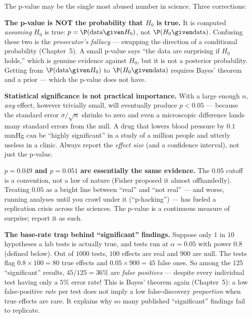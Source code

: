 The p-value may be the single most abused number in science. Three corrections:

\begin{trapbox}
\textbf{The p-value is NOT the probability that $H_0$ is true.} It is computed
\emph{assuming} $H_0$ is true: $p = \P(\text{data}\given H_0)$, not $\P(H_0\given
\text{data})$. Confusing these two is the \emph{prosecutor's fallacy} --- swapping the
direction of a conditional probability (Chapter~5). A small p-value says ``the data are
surprising if $H_0$ holds,'' which is genuine evidence against $H_0$, but it is not a
posterior probability. Getting from $\P(\text{data}\given H_0)$ to $\P(H_0\given
\text{data})$ requires Bayes' theorem and a prior --- which the p-value does not have.
\end{trapbox}

\begin{trapbox}
\textbf{Statistical significance is not practical importance.} With a large enough $n$,
\emph{any} effect, however trivially small, will eventually produce $p<0.05$ --- because
the standard error $\sigma/\sqrt n$ shrinks to zero and even a microscopic difference
lands many standard errors from the null. A drug that lowers blood pressure by
$0.1$ mmHg can be ``highly significant'' in a study of a million people and utterly
useless in a clinic. Always report the \emph{effect size} (and a confidence interval),
not just the p-value.
\end{trapbox}

\begin{trapbox}
\textbf{$p = 0.049$ and $p = 0.051$ are essentially the same evidence.} The $0.05$
cutoff is a convention, not a law of nature (Fisher proposed it almost offhandedly).
Treating $0.05$ as a bright line between ``real'' and ``not real'' --- and worse,
running analyses until you crawl under it (``p-hacking'') --- has fueled a replication
crisis across the sciences. The p-value is a continuous measure of surprise; report it
as such.
\end{trapbox}

\begin{paradoxbox}
\textbf{The base-rate trap behind ``significant'' findings.} Suppose only $1$ in $10$
hypotheses a lab tests is actually true, and tests run at $\alpha=0.05$ with power
$0.8$ (defined below). Out of $1000$ tests, $100$ effects are real and $900$ are null.
The tests flag $0.8\times 100 = 80$ true effects and $0.05\times 900 = 45$ false ones.
So among the $125$ ``significant'' results, $45/125 = 36\%$ are \emph{false positives}
--- despite every individual test having only a $5\%$ error rate! This is Bayes' theorem
again (Chapter~5): a low false-positive \emph{rate} per test does not imply a low
false-discovery \emph{proportion} when true effects are rare. It explains why so many
published ``significant'' findings fail to replicate.
\end{paradoxbox}

